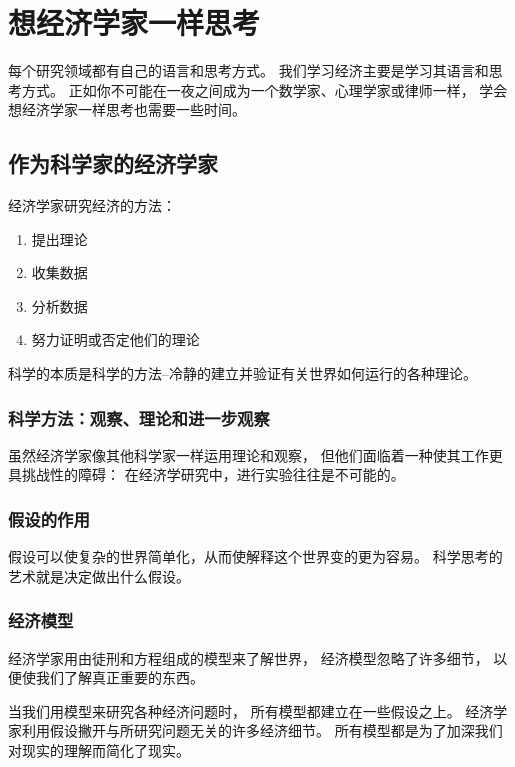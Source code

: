
\chapter{想经济学家一样思考}

每个研究领域都有自己的语言和思考方式。
我们学习经济主要是学习其语言和思考方式。
正如你不可能在一夜之间成为一个数学家、心理学家或律师一样，
学会想经济学家一样思考也需要一些时间。


\section{作为科学家的经济学家}

经济学家研究经济的方法：
\begin{enumerate}
\item 提出理论
\item 收集数据
\item 分析数据
\item 努力证明或否定他们的理论
\end{enumerate}


科学的本质是科学的方法--冷静的建立并验证有关世界如何运行的各种理论。

\subsection{科学方法：观察、理论和进一步观察}



虽然经济学家像其他科学家一样运用理论和观察，
但他们面临着一种使其工作更具挑战性的障碍：
在经济学研究中，进行实验往往是不可能的。


\subsection{假设的作用}

假设可以使复杂的世界简单化，从而使解释这个世界变的更为容易。
科学思考的艺术就是决定做出什么假设。


\subsection{经济模型}

经济学家用由徒刑和方程组成的模型来了解世界，
经济模型忽略了许多细节，
以便使我们了解真正重要的东西。

当我们用模型来研究各种经济问题时，
所有模型都建立在一些假设之上。
经济学家利用假设撇开与所研究问题无关的许多经济细节。
所有模型都是为了加深我们对现实的理解而简化了现实。



